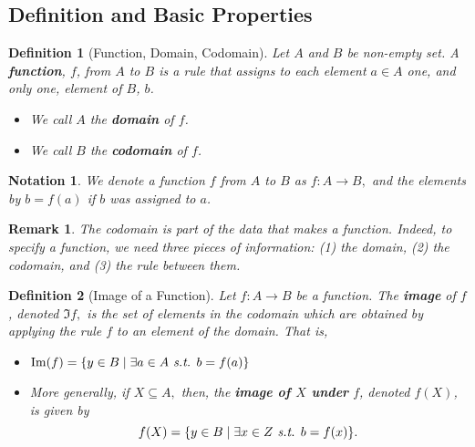 \documentclass[12pt,a4paper]{article}
\newtheorem{nota}{Notation}[section]
\newtheorem{df}{Definition}[subsection]
\newtheorem*{rmk}{\indent Remark}
\def\st{\emph{ s.t. }}
\begin{document}
\subsection{Definition and Basic Properties}
\begin{df}[Function, Domain, Codomain]
	Let $A$ and $B$ be non-empty set. A \textbf{function}, $f$, from $A$ to $B$ is a rule that assigns to each element $a\in A$ one, and only one, element of $B$, $b$.
	\begin{itemize}
		\item We call $A$ the \textbf{domain} of $f$.
		\item We call $B$ the \textbf{codomain} of $f$.
	\end{itemize}
\end{df}
\begin{nota}
	We denote a function $f$ from $A$ to $B$ as $f: A\to B,$ and the elements by $b=f(a)$ if $b$ was assigned to $a$. 	
\end{nota}
\begin{rmk}
	The codomain is part of the data that makes a function. Indeed, to specify a function, we need three pieces of information: (1) the domain, (2) the codomain, and (3) the rule between them. 
\end{rmk}
\begin{df}[Image of a Function]
	Let $f:A\to B$ be a function. The \textbf{image} of $f$, denoted $\Im{f},$ is the set of elements in the codomain which are obtained by applying the rule $f$ to an element of the domain. That is, 
	\begin{itemize}
		\item $\Im(f)=\qty{y\in B\mid\exists a\in A\st b=f(a)}$
		\item More generally, if $X\subseteq A,$ then, the \textbf{image of $X$ under }$f$, denoted $f(X)$, is given by \[f(X)=\qty{y\in B\mid\exists x\in Z\st b=f(x)}.\]
	\end{itemize}	
\end{df}
\end{document}
